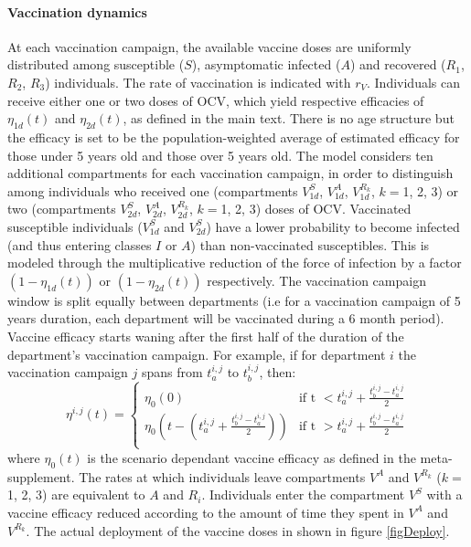 \paragraph{Vaccination dynamics} At each vaccination campaign, the available vaccine doses are uniformly distributed among susceptible ($S$), asymptomatic infected ($A$) and recovered ($R_{1}$, $R_2$, $R_3$) individuals. The rate of vaccination is indicated with $r_V$. Individuals can receive either one or two doses of OCV, which yield respective efficacies of $\eta_{1d}(t)$ and $\eta_{2d}(t)$, as defined in the main text. There is no age structure but the efficacy is set to be the population-weighted average of estimated efficacy for those under 5 years old and those over 5 years old.
 The model considers ten additional compartments for each vaccination campaign, in order to distinguish among individuals who received one (compartments $V^S_{1d}$, $V^A_{1d}$, $V^{R_k}_{1d}$, $k=$1, 2, 3) or two (compartments $V^S_{2d}$, $V^A_{2d}$, $V^{R_k}_{2d}$, $k=$1, 2, 3) doses of OCV. Vaccinated susceptible individuals ($V^S_{1d}$ and $V^S_{2d}$) have a lower probability to become infected (and thus entering classes $I$ or $A$) than non-vaccinated susceptibles. This is modeled through the multiplicative reduction of the force of infection by a  factor $(1-\eta_{1d}(t))$ or $(1-\eta_{2d}(t))$ respectively.
The vaccination campaign window is split equally between departments (i.e for a vaccination campaign of 5 years duration, each department will be vaccinated during a 6 month period). Vaccine efficacy starts waning after the first half of the duration of the department's vaccination campaign. For example, if for department $i$ the vaccination campaign $j$ spans from $t^{i,j}_a$ to $t^{i,j}_b$, then:
    \begin{equation}
\eta^{i,j}(t) = \left\{
    \begin{array}{ll}
        \eta_0(0) & \mbox{if t $<  t^{i,j}_a + \frac{t^{i,j}_b - t^{i,j}_a}{2}$} \\
        \eta_0(t -  (t^{i,j}_a +  \frac{t^{i,j}_b - t^{i,j}_a}{2}) ) & \mbox{if t $>  t^{i,j}_a + \frac{t^{i,j}_b - t^{i,j}_a}{2}$} \\
    \end{array}
\right.
\end{equation}
where $\eta_0(t)$ is the scenario dependant vaccine efficacy as defined in the meta-supplement.
The rates at which individuals leave compartments $V^A$ and $V^{R_k}$ ($k=$1, 2, 3) are equivalent to $A$ and $R_i$. Individuals enter the compartment $V^S$ with a vaccine efficacy reduced according to the amount of time they spent in $V^A$ and $V^{R_k}$. The actual deployment of the vaccine doses in shown in figure \ref{figDeploy}.

